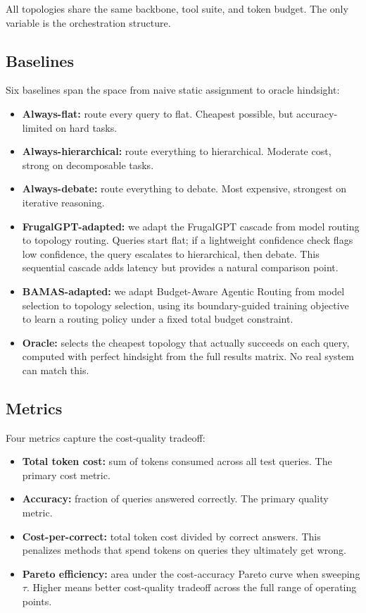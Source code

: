All topologies share the same backbone, tool suite, and token budget. The only variable is the orchestration structure.

\subsection{Baselines}\label{baselines}

Six baselines span the space from naive static assignment to oracle hindsight:

\begin{itemize}
\tightlist
\item
  \textbf{Always-flat:} route every query to flat. Cheapest possible, but accuracy-limited on hard tasks.
\item
  \textbf{Always-hierarchical:} route everything to hierarchical. Moderate cost, strong on decomposable tasks.
\item
  \textbf{Always-debate:} route everything to debate. Most expensive, strongest on iterative reasoning.
\item
  \textbf{FrugalGPT-adapted:} we adapt the FrugalGPT cascade \cite{chen_2023} from model routing to topology routing. Queries start flat; if a lightweight confidence check flags low confidence, the query escalates to hierarchical, then debate. This sequential cascade adds latency but provides a natural comparison point.
\item
  \textbf{BAMAS-adapted:} we adapt Budget-Aware Agentic Routing \cite{zhang_2026} from model selection to topology selection, using its boundary-guided training objective to learn a routing policy under a fixed total budget constraint.
\item
  \textbf{Oracle:} selects the cheapest topology that actually succeeds on each query, computed with perfect hindsight from the full results matrix. No real system can match this.
\end{itemize}

\subsection{Metrics}\label{metrics}

Four metrics capture the cost-quality tradeoff:

\begin{itemize}
\tightlist
\item
  \textbf{Total token cost:} sum of tokens consumed across all test queries. The primary cost metric.
\item
  \textbf{Accuracy:} fraction of queries answered correctly. The primary quality metric.
\item
  \textbf{Cost-per-correct:} total token cost divided by correct answers. This penalizes methods that spend tokens on queries they ultimately get wrong.
\item
  \textbf{Pareto efficiency:} area under the cost-accuracy Pareto curve when sweeping $\tau$. Higher means better cost-quality tradeoff across the full range of operating points.
\end{itemize}

